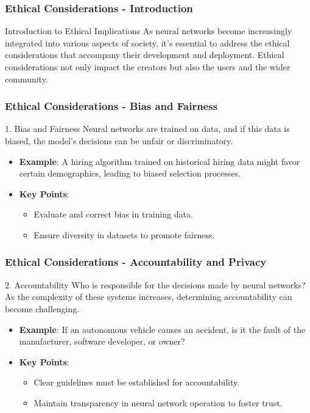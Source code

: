 \documentclass[aspectratio=169]{beamer}
\begin{document}
\begin{frame}[fragile]
    \frametitle{Ethical Considerations - Introduction}
    \begin{block}{Introduction to Ethical Implications}
        As neural networks become increasingly integrated into various aspects of society, it’s essential to address the ethical considerations that accompany their development and deployment. Ethical considerations not only impact the creators but also the users and the wider community.
    \end{block}
\end{frame}

\begin{frame}[fragile]
    \frametitle{Ethical Considerations - Bias and Fairness}
    \begin{block}{1. Bias and Fairness}
        Neural networks are trained on data, and if this data is biased, the model’s decisions can be unfair or discriminatory.
    \end{block}
    \begin{itemize}
        \item \textbf{Example}: A hiring algorithm trained on historical hiring data might favor certain demographics, leading to biased selection processes.
        \item \textbf{Key Points}:
        \begin{itemize}
            \item Evaluate and correct bias in training data.
            \item Ensure diversity in datasets to promote fairness.
        \end{itemize}
    \end{itemize}
\end{frame}

\begin{frame}[fragile]
    \frametitle{Ethical Considerations - Accountability and Privacy}
    \begin{block}{2. Accountability}
        Who is responsible for the decisions made by neural networks? As the complexity of these systems increases, determining accountability can become challenging.
    \end{block}
    \begin{itemize}
        \item \textbf{Example}: If an autonomous vehicle causes an accident, is it the fault of the manufacturer, software developer, or owner?
        \item \textbf{Key Points}:
        \begin{itemize}
            \item Clear guidelines must be established for accountability.
            \item Maintain transparency in neural network operation to foster trust.
        \end{itemize}
    \end{itemize}
\end{frame}
\end{document}
